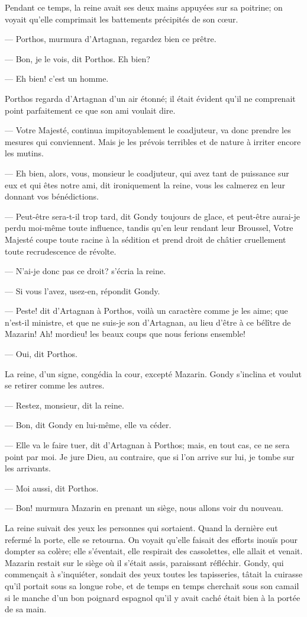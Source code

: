 Pendant ce temps, la reine avait ses deux mains appuyées sur sa poitrine; on voyait qu'elle comprimait les battements précipités de son cœur.

— Porthos, murmura d'Artagnan, regardez bien ce prêtre.

— Bon, je le vois, dit Porthos. Eh bien?

— Eh bien! c'est un homme.

Porthos regarda d'Artagnan d'un air étonné; il était évident qu'il ne comprenait point parfaitement ce que son ami voulait dire.

— Votre Majesté, continua impitoyablement le coadjuteur, va donc prendre les mesures qui conviennent. Mais je les prévois terribles et de nature à irriter encore les mutins.

— Eh bien, alors, vous, monsieur le coadjuteur, qui avez tant de puissance sur eux et qui êtes notre ami, dit ironiquement la reine, vous les calmerez en leur donnant vos bénédictions.

— Peut-être sera-t-il trop tard, dit Gondy toujours de glace, et peut-être aurai-je perdu moi-même toute influence, tandis qu'en leur rendant leur Broussel, Votre Majesté coupe toute racine à la sédition et prend droit de châtier cruellement toute recrudescence de révolte.

— N'ai-je donc pas ce droit? s'écria la reine.

— Si vous l'avez, usez-en, répondit Gondy.

— Peste! dit d'Artagnan à Porthos, voilà un caractère comme je les aime; que n'est-il ministre, et que ne suis-je son d'Artagnan, au lieu d'être à ce bélître de Mazarin! Ah! mordieu! les beaux coups que nous ferions ensemble!

— Oui, dit Porthos.

La reine, d'un signe, congédia la cour, excepté Mazarin. Gondy s'inclina et voulut se retirer comme les autres.

— Restez, monsieur, dit la reine.

— Bon, dit Gondy en lui-même, elle va céder.

— Elle va le faire tuer, dit d'Artagnan à Porthos; mais, en tout cas, ce ne sera point par moi. Je jure Dieu, au contraire, que si l'on arrive sur lui, je tombe sur les arrivants.

— Moi aussi, dit Porthos.

— Bon! murmura Mazarin en prenant un siège, nous allons voir du nouveau.

La reine suivait des yeux les personnes qui sortaient. Quand la dernière eut refermé la porte, elle se retourna. On voyait qu'elle faisait des efforts inouïs pour dompter sa colère; elle s'éventait, elle respirait des cassolettes, elle allait et venait. Mazarin restait sur le siège où il s'était assis, paraissant réfléchir. Gondy, qui commençait à s'inquiéter, sondait des yeux toutes les tapisseries, tâtait la cuirasse qu'il portait sous sa longue robe, et de temps en temps cherchait sous son camail si le manche d'un bon poignard espagnol qu'il y avait caché était bien à la portée de sa main.


